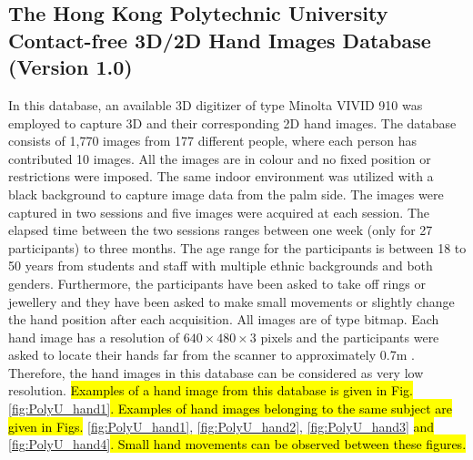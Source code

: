 \documentclass[review]{elsarticle}
\begin{document}
\subsection{The Hong Kong Polytechnic University Contact-free 3D/2D Hand Images Database (Version 1.0)} 
	In this database, an available 3D digitizer of type Minolta VIVID 910 was employed to capture 3D and their corresponding 2D hand images. The database consists of 1,770 images from 177 different people, where each person has contributed 10 images. All the images are in colour and no fixed position or restrictions were imposed. The same indoor environment was utilized with a black background to capture image data from the palm side. The images were captured in two sessions and five images were acquired at each session. The elapsed time between the two sessions ranges between one week (only for 27 participants) to three months. The age range for the participants is between 18 to 50 years from students and staff with multiple ethnic backgrounds and both genders. Furthermore, the participants have been asked to take off rings or jewellery and they have been asked to make small movements or slightly change the hand position after each acquisition. All images are of type bitmap. Each hand image has a resolution of $640\times 480\times 3$ pixels and the participants were asked to locate their hands far from the scanner to approximately 0.7m \cite{Databasever1PolyU3D2D}. Therefore, the hand images in this database can be considered as very low resolution. 
	\hl{Examples of a hand image from this database is given in Fig.} \ref{fig:PolyU_hand1}\hl{.
	Examples of hand images belonging to the same subject are given in Figs.} \ref{fig:PolyU_hand1}, \ref{fig:PolyU_hand2}, \ref{fig:PolyU_hand3} \hl{and} \ref{fig:PolyU_hand4}\hl{. Small hand movements can be observed between these figures.}
\end{document}
